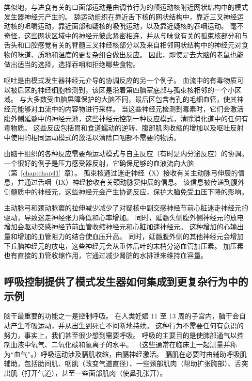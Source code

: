 类似地，与进食有关的口面部运动是由调节行为的颅运动核附近网状结构中的模式发生器神经元产生的。
舔运动组织在靠近舌下核的网状结构中，靠近三叉神经运动核的咀嚼运动，靠近面部和疑核的吸吮运动，以及靠近疑核的吞咽运动。
毫不奇怪，这些网状区域中的神经元彼此紧密相连，并从与味觉有关的孤束核部分和与舌头和口腔感觉有关的脊髓三叉神经核部分以及来自相邻网状结构中的神经元对食物的味道、质地和温度的更复杂组合做出反应。
因此，即使是去大脑的老鼠也能做出适当的选择，选择吞咽和拒绝哪些食物。


呕吐是由模式发生器神经元介导的协调反应的另一个例子。
血流中的有毒物质可以被后区的神经细胞检测到，该区是沿着第四脑室底部与孤束核相邻的一个小区域。
与大多数受血脑屏障保护的大脑不同，最后区包含有孔的毛细血管，使其神经元能够对血流中的内容物进行采样。
当这些神经元检测到毒素时，它们会激活腹外侧延髓中的神经元池，这些神经元控制一种反应模式，清除消化道中的任何有毒物质。
这些反应包括胃和食道蠕动的逆转、腹部肌肉收缩的增加以及呕吐反射中使用的相同运动模式的激活以清除口咽部不需要的物质。


由脑干组织的各种反应需要颅运动模式与自主反应（有时是内分泌反应）的协调。
一个很好的例子是压力感受器反射，它确保足够的血液流向大脑（第~\ref{chap:chap41}~章）。
孤束核通过迷走神经（X）接收有关主动脉弓伸展的信息，并通过舌咽（IX）神经接收有关颈动脉窦伸展的信息。
该信息被传递到腹外侧髓质中的神经元，这些神经元会产生协调反应，保护大脑免受血压下降的影响。


主动脉弓和颈动脉窦的拉伸减少减少了对疑核中副交感神经节前心脏迷走神经元的驱动，导致迷走神经张力降低和心率增加。
同时，延髓头侧腹外侧神经元的放电增加会驱动交感神经节前血管收缩神经元和心脏加速神经元。
这种增加的心输出量和增加的血管阻力的结合使血压升高。
同时，延髓腹外侧的其他神经元会增加下丘脑神经元的放电，这些神经元会从垂体后叶的末梢分泌血管加压素。
加压素也有直接的血管收缩作用，它通过减少肾脏的水排泄来维持血容量。



\subsection{呼吸控制提供了模式发生器如何集成到更复杂行为中的示例}

脑干最重要的功能之一是控制呼吸。
在人类妊娠 11 至 13 周的子宫内，脑干会自动产生呼吸运动，并从出生到死亡不间断地持续。
这种行为不需要任何有意识的努力，事实上，我们甚至很少想到需要呼吸。
呼吸的主要目的是使肺部通气以控制血液中氧气、二氧化碳和氢离子的水平。
（这些通常在临床上一起测量并称为“血气”。）呼吸运动涉及膈肌收缩，由膈神经激活。
膈肌在必要时由辅助呼吸肌辅助，包括肋间肌、咽肌（改变气道直径）、一些颈部肌肉（帮助扩张胸部）、舌突出肌（打开气道），甚至一些面部肌肉（使鼻孔张开）。


